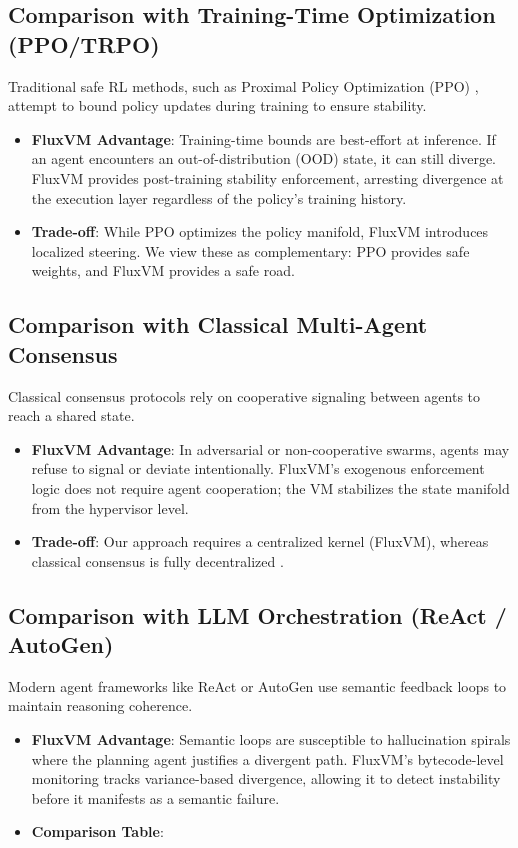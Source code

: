 \documentclass{article}
\begin{document}
\subsection{Comparison with Training-Time Optimization (PPO/TRPO)}
Traditional safe RL methods, such as Proximal Policy Optimization (PPO) \cite{schulman2017proximal}, attempt to bound policy updates during training to ensure stability.
\begin{itemize}
    \item \textbf{FluxVM Advantage}: Training-time bounds are best-effort at inference. If an agent encounters an out-of-distribution (OOD) state, it can still diverge. FluxVM provides post-training stability enforcement, arresting divergence at the execution layer regardless of the policy's training history.
    \item \textbf{Trade-off}: While PPO optimizes the policy manifold, FluxVM introduces localized steering. We view these as complementary: PPO provides safe weights, and FluxVM provides a safe road.
\end{itemize}

\subsection{Comparison with Classical Multi-Agent Consensus}
Classical consensus protocols \cite{olfati2007consensus, ren2008distributed} rely on cooperative signaling between agents to reach a shared state.
\begin{itemize}
    \item \textbf{FluxVM Advantage}: In adversarial or non-cooperative swarms, agents may refuse to signal or deviate intentionally. FluxVM's exogenous enforcement logic does not require agent cooperation; the VM stabilizes the state manifold from the hypervisor level.
    \item \textbf{Trade-off}: Our approach requires a centralized kernel (FluxVM), whereas classical consensus is fully decentralized \cite{mesbahi2010graph}.
\end{itemize}

\subsection{Comparison with LLM Orchestration (ReAct / AutoGen)}
Modern agent frameworks like ReAct \cite{yao2022react} or AutoGen \cite{hoover2023autogen} use semantic feedback loops to maintain reasoning coherence.
\begin{itemize}
    \item \textbf{FluxVM Advantage}: Semantic loops are susceptible to hallucination spirals where the planning agent justifies a divergent path. FluxVM's bytecode-level monitoring tracks variance-based divergence, allowing it to detect instability before it manifests as a semantic failure.
    \item \textbf{Comparison Table}:
\end{itemize}
\end{document}
